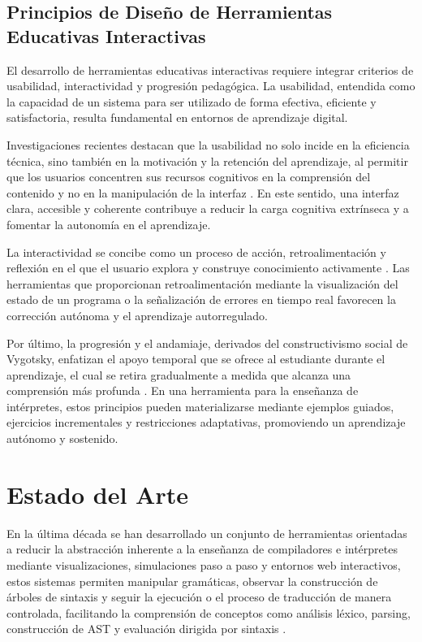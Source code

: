 \subsection{Principios de Diseño de Herramientas Educativas Interactivas}

El desarrollo de herramientas educativas interactivas requiere integrar criterios de usabilidad, interactividad y progresión pedagógica. La usabilidad, entendida como la capacidad de un sistema para ser utilizado de forma efectiva, eficiente y satisfactoria, resulta fundamental en entornos de aprendizaje digital. 

Investigaciones recientes destacan que la usabilidad no solo incide en la eficiencia técnica, sino también en la motivación y la retención del aprendizaje, al permitir que los usuarios concentren sus recursos cognitivos en la comprensión del contenido y no en la manipulación de la interfaz \cite{lu2022usability}. En este sentido, una interfaz clara, accesible y coherente contribuye a reducir la carga cognitiva extrínseca y a fomentar la autonomía en el aprendizaje.

La interactividad se concibe como un proceso de acción, retroalimentación y reflexión en el que el usuario explora y construye conocimiento activamente \cite{hernandez2022aprendizaje}. Las herramientas que proporcionan retroalimentación mediante la visualización del estado de un programa o la señalización de errores en tiempo real favorecen la corrección autónoma y el aprendizaje autorregulado.

Por último, la progresión y el andamiaje, derivados del constructivismo social de Vygotsky, enfatizan el apoyo temporal que se ofrece al estudiante durante el aprendizaje, el cual se retira gradualmente a medida que alcanza una comprensión más profunda \cite{benitez2023constructivismo}. En una herramienta para la enseñanza de intérpretes, estos principios pueden materializarse mediante ejemplos guiados, ejercicios incrementales y restricciones adaptativas, promoviendo un aprendizaje autónomo y sostenido.

\section{Estado del Arte}

En la última década se han desarrollado un conjunto de herramientas orientadas a reducir la abstracción inherente a la enseñanza de compiladores e intérpretes mediante visualizaciones, simulaciones paso a paso y entornos web interactivos, estos sistemas permiten manipular gramáticas, observar la construcción de árboles de sintaxis y seguir la ejecución o el proceso de traducción de manera controlada, facilitando la comprensión de conceptos como análisis léxico, parsing, construcción de AST y evaluación dirigida por sintaxis \cite{jovanovic2021comvis,delvado2023itt,ortin2022antlr}.

